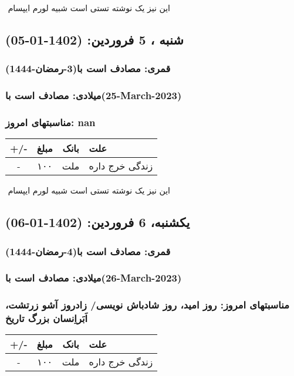 \documentclass{article}
\newcommand{\rnote}[1]{\marginpar{\textcolor{color}{\StrSubstitute{\##1}{ }{\_}}}}
\newcommand{\myRow}[4]{
    #1 & #2 & #3 & #4 \\ \hline
}
\begin{document}
‌
\rnote{تست}
این نیز یک نوشته تستی است شبیه لورم ایپسام




\newpage
{}
\textcolor{color}{
\section{ شنبه ، 5 فروردین: (1402-01-05) }
\subsubsection*{قمری: مصادف است با(3-رمضان-1444)} 
\subsubsection*{میلادی: مصادف است با(25-March-2023)}
\subsubsection*{مناسبتهای امروز: nan}
}


\begin{tabular}{ | c | c | c | p{5cm} |}
    \hline
    \myRow{ +/- }{مبلغ}{بانک}{علت}
    \myRow{-}{۱۰۰}{ملت}{زندگی خرج داره}
\end{tabular}
\newline
\newline

‌
\rnote{تست}
این نیز یک نوشته تستی است شبیه لورم ایپسام




\newpage
{}
\textcolor{color}{
\section{ یکشنبه، 6 فروردین: (1402-01-06) }
\subsubsection*{قمری: مصادف است با(4-رمضان-1444)} 
\subsubsection*{میلادی: مصادف است با(26-March-2023)}
\subsubsection*{مناسبتهای امروز: روز امید، روز شادباش نویسی/ زادروز آشو زرتشت، اَبَراِنسان بزرگ تاریخ}
}


\begin{tabular}{ | c | c | c | p{5cm} |}
    \hline
    \myRow{ +/- }{مبلغ}{بانک}{علت}
    \myRow{-}{۱۰۰}{ملت}{زندگی خرج داره}
\end{tabular}
\newline
\newline
\end{document}
